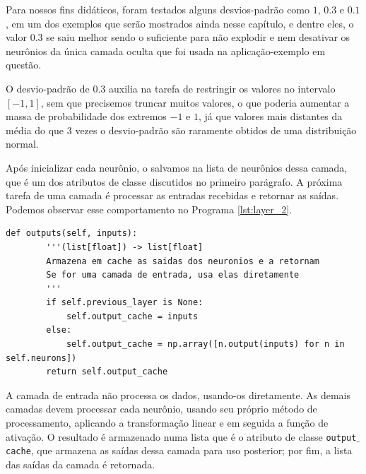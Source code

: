 Para nossos fins didáticos, foram testados alguns desvios-padrão como $1$, $0.3$ e $0.1$, em um dos exemplos que serão mostrados ainda nesse capítulo, e dentre eles, o valor $0.3$ se saiu melhor sendo o suficiente para não explodir e nem desativar os neurônios da única camada oculta que foi usada na aplicação-exemplo em questão.

O desvio-padrão de $0.3$ auxilia na tarefa de restringir os valores no intervalo $[-1, 1]$, sem que precisemos truncar muitos valores, o que poderia aumentar a massa de probabilidade dos extremos $-1$ e $1$, já que valores mais distantes da média do que $3$ vezes o desvio-padrão são raramente obtidos de uma distribuição normal. 

Após inicializar cada neurônio, o salvamos na lista de neurônios dessa camada, que é um dos atributos de classe discutidos no primeiro parágrafo. A próxima tarefa de uma camada é processar as entradas recebidas e retornar as saídas. Podemos observar esse comportamento no Programa \ref{lst:layer_2}.
\newline
\estiloR
\begin{lstlisting}[caption={Trecho da classe \eng{Layer}}, label={lst:layer_2}, escapeinside={\%}]
def outputs(self, inputs):
        '''(list[float]) -> list[float]
        Armazena em cache as saidas dos neuronios e a retornam
        Se for uma camada de entrada, usa elas diretamente
        '''
        if self.previous_layer is None:
            self.output_cache = inputs
        else:
            self.output_cache = np.array([n.output(inputs) for n in self.neurons])
        return self.output_cache
\end{lstlisting}


A camada de entrada não processa os dados, usando-os diretamente. As demais camadas devem processar cada neurônio, usando seu próprio método de processamento, aplicando a transformação linear e em seguida a função de ativação. O resultado é armazenado numa lista  que é o atributo de classe \texttt{output$\_$cache}, que armazena as saídas dessa camada para uso posterior; por fim, a lista das saídas da camada é retornada.

